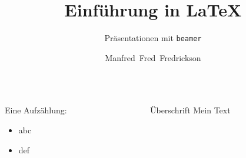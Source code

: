 \documentclass{beamer}
\title{Einf\"uhrung in \LaTeX}
\subtitle{Pr\"asentationen mit \texttt{beamer}}
\author{Manfred~Fred~Fredrickson}
\institute{Fakult\"at~f\"ur~Mathematik, TU~Dortmund}
\begin{document}
\begin{frame}
  \maketitle
\end{frame}

\begin{frame}[<+->]
  \begin{columns}[T]
    \begin{column}{0.49\textwidth}
      Eine Aufzählung:
      \begin{itemize}
        \item{abc}
        \item{def}
      \end{itemize}
    \end{column}
    \begin{column}{0.49\textwidth}
      \begin{block}{Überschrift}
        Mein Text
      \end{block}
    \end{column}
  \end{columns}
\end{frame}
\end{document}
